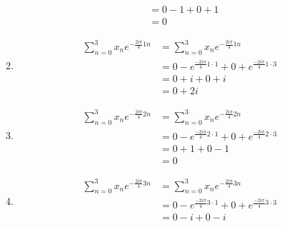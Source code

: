 \documentclass{article}
\begin{document}
\begin{enumerate}[label=\Alph*)]
\begin{enumerate}[label={k=\arabic*}, start=0]
\begin{align*}
                                                                     & = 0 - 1 + 0 + 1                                                               \\
                                                                     & = 0
                    \end{align*}
              \item \begin{align*}
                        \sum_{n=0}^{3}{x_n e^{-\frac{2 i \pi}{4}1n}} & = \sum_{n=0}^{3}{x_n e^{-\frac{2 i \pi}{4}1n}}                                \\
                                                                     & = 0 - e^{\frac{-2 i \pi}{4} 1 \cdot 1} + 0 + e^{\frac{-2 i \pi}{4} 1 \cdot 3} \\
                                                                     & = 0 + i + 0 + i                                                               \\
                                                                     & = 0 + 2i
                    \end{align*}
              \item \begin{align*}
                        \sum_{n=0}^{3}{x_n e^{-\frac{2 i \pi}{4}2n}} & = \sum_{n=0}^{3}{x_n e^{-\frac{2 i \pi}{4}2n}}                                \\
                                                                     & = 0 - e^{\frac{-2 i \pi}{4} 2 \cdot 1} + 0 + e^{\frac{-2 i \pi}{4} 2 \cdot 3} \\
                                                                     & = 0 + 1 + 0 - 1                                                               \\
                                                                     & = 0
                    \end{align*}
              \item \begin{align*}
                        \sum_{n=0}^{3}{x_n e^{-\frac{2 i \pi}{4}3n}} & = \sum_{n=0}^{3}{x_n e^{-\frac{2 i \pi}{4}3n}}                                \\
                                                                     & = 0 - e^{\frac{-2 i \pi}{4} 3 \cdot 1} + 0 + e^{\frac{-2 i \pi}{4} 3 \cdot 3} \\
                                                                     & = 0 - i + 0 - i                                                               \\

\end{align*}
\end{enumerate}
\end{enumerate}
\end{document}
